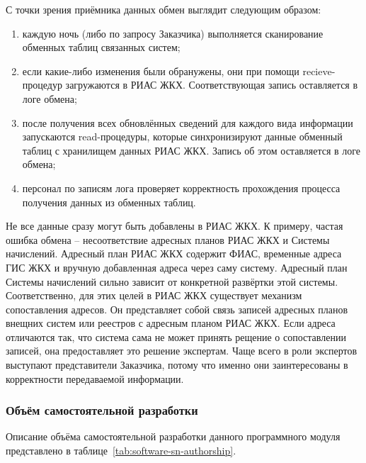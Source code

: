 С точки зрения приёмника данных обмен выглядит следующим образом:
\begin{enumerate}
	\item каждую ночь (либо по запросу Заказчика) выполняется сканирование обменных таблиц связанных систем;
	\item если какие-либо изменения были обранужены, они при помощи recieve-процедур загружаются в РИАС ЖКХ. Соответствующая запись оставляется в логе обмена;
	\item после получения всех обновлённых сведений для каждого вида информации запускаются read-процедуры, которые синхронизируют данные обменный таблиц с хранилищем данных РИАС ЖКХ. Запись об этом оставляется в логе обмена;
	\item персонал по записям лога проверяет корректность прохождения процесса получения данных из обменных таблиц.
\end{enumerate}

Не все данные сразу могут быть добавлены в РИАС ЖКХ.
К примеру, частая ошибка обмена -- несоответствие адресных планов РИАС ЖКХ и Системы начислений.
Адресный план РИАС ЖКХ содержит ФИАС, временные адреса ГИС ЖКХ и вручную добавленная адреса через саму систему.
Адресный план Системы начислений сильно зависит от конкретной развёртки этой системы.
Соответственно, для этих целей в РИАС ЖКХ существует механизм сопоставления адресов.
Он представляет собой связь записей адресных планов внещних систем или реестров с адресным планом РИАС ЖКХ.
Если адреса отличаются так, что система сама не может принять рещение о сопоставлении записей, она предоставляет это решение экспертам.
Чаще всего в роли экспертов выступают представители Заказчика, потому что именно они заинтересованы в корректности передаваемой информации.

\subsubsection{Объём самостоятельной разработки}

Описание объёма самостоятельной разработки данного программного модуля представлено в таблице~\ref{tab:software-sn-authorship}.

